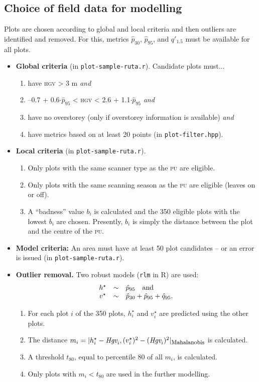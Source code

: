 \documentclass[english,a4paper,minion,nofigsidecaption]{article}
\providecommand{\abbr}[1]{\texorpdfstring{\textsc{\MakeLowercase{#1}}}{#1}}
\newcommand{\pu}{\abbr{PU}}
\newcommand{\first}[1]{\ensuremath{\hat{#1}}}
\newcommand{\perc}[1]{\ensuremath{\first{p}_{#1}}}
\newcommand{\hveg}[1]{\ensuremath{\first{q}_{#1}}}
\newcommand{\prop}[1]{\ensuremath{q'_{#1}}}
\newcommand{\thresholdperc}{80}
\newcommand{\numofplots}{350}
\begin{document}
\subsection{Choice of field data for modelling}

Plots are chosen according to global and local criteria and then outliers are identified and removed. 
For this, metrics \perc{30}, \perc{95}, and \prop{1.5} must be available for all plots. 
\begin{itemize}
	\item \textbf{Global criteria} (in \texttt{plot-sample-ruta.r}). Candidate plots must...
		\begin{enumerate}
			\item have \abbr{HGV} > 3 m \emph{and} 
			\item –0.7 + 0.6$\cdot$\perc{95} < \abbr{HGV} < 2.6 + 1.1$\cdot$\perc{95} \emph{and}
			\item have no overstorey (only if overstorey information is available) \emph{and} 
			\item have metrics based on at least 20 points (in \texttt{plot-filter.hpp}). 
		\end{enumerate}
	\item \textbf{Local criteria} (in \texttt{plot-sample-ruta.r}).  
		\begin{enumerate}
			\item Only plots with the same scanner type as the {\pu} are eligible. 
			\item Only plots with the same scanning season as the {\pu} are eligible (leaves on or off). 
			\item A “badness” value $b_i$ is calculated and the {\numofplots} eligible plots with the lowest $b_i$ are chosen. Presently, $b_i$ is simply the distance between the plot and the centre of the \pu. 
		\end{enumerate}
	\item \textbf{Model criteria:} An area must have at least 50 plot candidates – or an error is issued (in \texttt{plot-sample-ruta.r}). 
	\item \textbf{Outlier removal.} Two robust models (\texttt{rlm} in R) are used:
		$$
			\begin{array}{c@{\quad\sim\quad}l}
				h^\star   	& \perc{95}	\quad\textrm{and}\\
				v^\star		& \perc{30} + \perc{95} + \hveg{95}.
			\end{array}
		$$
		\begin{enumerate}
			\item For each plot $i$ of the {\numofplots} plots, $h^\star_i$ and $v^\star_i$ are predicted using the other plots. 
			\item The distance $m_i = |h^\star_i - \textit{Hgv}_i, (v^\star_i)^2 - (\textit{Hgv}_i)^2|_\textrm{\footnotesize{Mahalanobis}}$ is calculated. 
			\item A threshold $t_{\thresholdperc}$, equal to percentile {\thresholdperc} of all $m_i$, is calculated. 
			\item Only plots with $m_i < t_{\thresholdperc}$ are used in the further modelling. 
		\end{enumerate}
\end{itemize}
\end{document}
